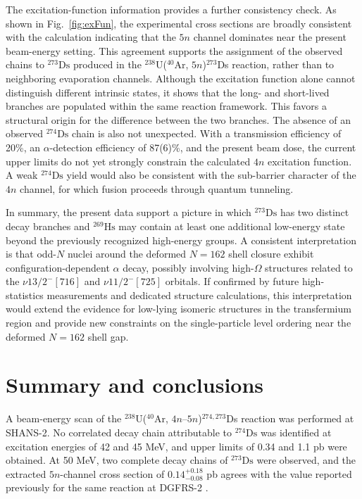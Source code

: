 \documentclass[aps,prc,reprint,superscriptaddress,floatfix]{revtex4-2}
\begin{document}
The excitation-function information provides a further consistency check. As shown in Fig.~\ref{fig:exFun}, the experimental cross sections are broadly consistent with the calculation indicating that the $5n$ channel dominates near the present beam-energy setting. This agreement supports the assignment of the observed chains to $^{273}\mathrm{Ds}$ produced in the $^{238}$U($^{40}$Ar, $5n$)$^{273}$Ds reaction, rather than to neighboring evaporation channels. Although the excitation function alone cannot distinguish different intrinsic states, it shows that the long- and short-lived branches are populated within the same reaction framework. This favors a structural origin for the difference between the two branches. The absence of an observed $^{274}\mathrm{Ds}$ chain is also not unexpected. With a transmission efficiency of 20\%, an $\alpha$-detection efficiency of 87(6)\%, and the present beam dose, the current upper limits do not yet strongly constrain the calculated $4n$ excitation function. A weak $^{274}\mathrm{Ds}$ yield would also be consistent with the sub-barrier character of the $4n$ channel, for which fusion proceeds through quantum tunneling.

In summary, the present data support a picture in which $^{273}\mathrm{Ds}$ has two distinct decay branches and $^{269}\mathrm{Hs}$ may contain at least one additional low-energy state beyond the previously recognized high-energy groups. A consistent interpretation is that odd-$N$ nuclei around the deformed $N = 162$ shell closure exhibit configuration-dependent $\alpha$ decay, possibly involving high-$\Omega$ structures related to the $\nu 13/2^{-}[716]$ and $\nu 11/2^{-}[725]$ orbitals. If confirmed by future high-statistics measurements and dedicated structure calculations, this interpretation would extend the evidence for low-lying isomeric structures in the transfermium region and provide new constraints on the single-particle level ordering near the deformed $N = 162$ shell gap.

\section{Summary and conclusions}

A beam-energy scan of the $^{238}$U($^{40}$Ar, $4n$--$5n$)$^{274,273}$Ds reaction was performed at SHANS-2. No correlated decay chain attributable to $^{274}\mathrm{Ds}$ was identified at excitation energies of 42 and 45 MeV, and upper limits of 0.34 and 1.1 pb were obtained. At 50 MeV, two complete decay chains of $^{273}\mathrm{Ds}$ were observed, and the extracted $5n$-channel cross section of $0.14^{+0.18}_{-0.08}$ pb agrees with the value reported previously for the same reaction at DGFRS-2 \cite{oganessian2024SynthesisDecayProperties}.
\end{document}
